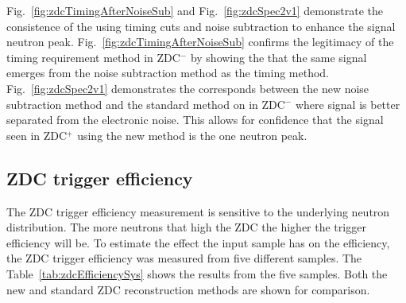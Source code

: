        Fig.~\ref{fig:zdcTimingAfterNoiseSub} and Fig.~\ref{fig:zdcSpec2v1} 
        demonstrate the consistence of the using timing cuts and noise 
        subtraction to enhance the signal neutron peak. 
      Fig.~\ref{fig:zdcTimingAfterNoiseSub} confirms the legitimacy of the 
        timing requirement method in ZDC$^{-}$ by showing the that the same
        signal emerges from the noise subtraction method as the timing method.
      Fig.~\ref{fig:zdcSpec2v1} demonstrates the corresponds between
        the new noise subtraction method and the standard method on in 
        ZDC$^{-}$ where signal is better separated from the electronic noise. 
      This allows for confidence that the signal seen in ZDC$^{+}$ using 
        the new method is the one neutron peak.

    \subsection{ZDC trigger efficiency}
      The ZDC trigger efficiency measurement is sensitive to the underlying 
        neutron distribution.
      The more neutrons that high the ZDC the higher the trigger efficiency 
        will be.
      To estimate the effect the input sample has on the efficiency, the ZDC 
        trigger efficiency was measured from five different samples.
      The Table~\ref{tab:zdcEfficiencySys} shows the results from the 
       five samples. 
      Both the new and standard ZDC reconstruction methods are shown for 
        comparison.

